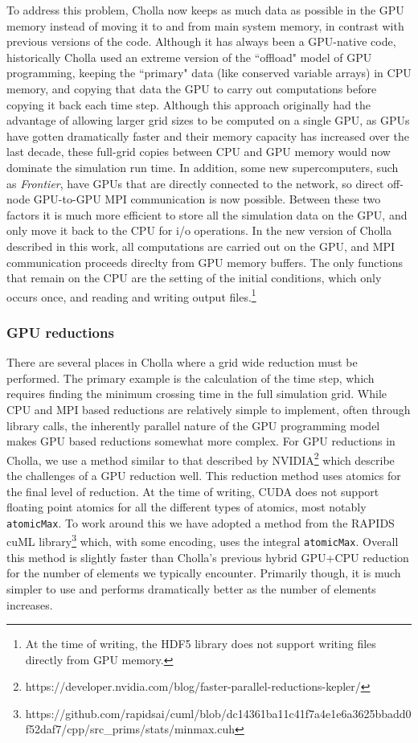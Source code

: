To address this problem, Cholla now keeps as much data as possible in the GPU memory instead of moving it to and from main system memory, in contrast with previous versions of the code. Although it has always been a GPU-native code, historically Cholla used an extreme version of the ``offload" model of GPU programming, keeping the ``primary" data (like conserved variable arrays) in CPU memory, and copying that data the GPU to carry out computations before copying it back each time step. Although this approach originally had the advantage of allowing larger grid sizes to be computed on a single GPU, as GPUs have gotten dramatically faster and their memory capacity has increased over the last decade, these full-grid copies between CPU and GPU memory would now dominate the simulation run time. In addition, some new supercomputers, such as \textit{Frontier}, have GPUs that are directly connected to the network, so direct off-node GPU-to-GPU MPI communication is now possible. Between these two factors it is much more efficient to store all the simulation data on the GPU, and only move it back to the CPU for i/o operations. In the new version of Cholla described in this work, all computations are carried out on the GPU, and  MPI communication proceeds direclty from GPU memory buffers. The only functions that remain on the CPU are the setting of the initial conditions, which only occurs once, and reading and writing output files.\footnote{At the time of writing, the HDF5 library does not support writing files directly from GPU memory.}

\subsubsection{GPU reductions}

There are several places in Cholla where a grid wide reduction must be performed. The primary example is the calculation of the time step, which requires finding the minimum crossing time in the full simulation grid. While CPU and MPI based reductions are relatively simple to implement, often through library calls, the inherently parallel nature of the GPU programming model makes GPU based reductions somewhat more complex. For GPU reductions in Cholla, we use a method similar to that described by NVIDIA\footnote{https://developer.nvidia.com/blog/faster-parallel-reductions-kepler/} which describe the challenges of a GPU reduction well. This reduction method uses atomics for the final level of reduction. At the time of writing, CUDA does not support floating point atomics for all the different types of atomics, most notably \texttt{atomicMax}. To work around this we have adopted a method from the RAPIDS cuML library\footnote{https://github.com/rapidsai/cuml/blob/dc14361ba11c41f7a4e1e6a3625bbadd0f52daf7/cpp/src\_prims/stats/minmax.cuh} which, with some encoding, uses the integral \texttt{atomicMax}. Overall this method is slightly faster than Cholla's previous hybrid GPU+CPU reduction for the number of elements we typically encounter. Primarily though, it is much simpler to use and performs dramatically better as the number of elements increases.

